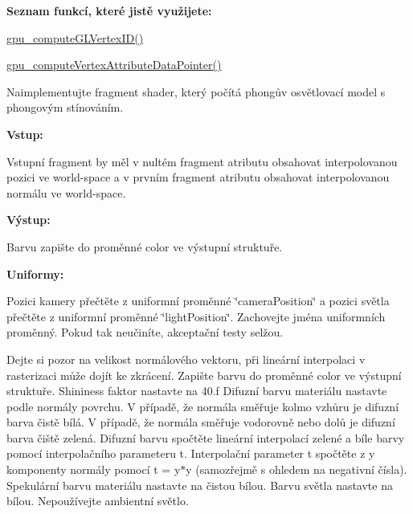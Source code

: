 \begin{DoxyRefList}
 {\bfseries Seznam funkcí, které jistě využijete\-:}
\begin{DoxyItemize}
\item \hyperlink{group__gpu__side_ga3983ddd2c559c1a6d1e1f1f37be3eae0}{gpu\-\_\-compute\-G\-L\-Vertex\-I\-D()}
\item \hyperlink{group__gpu__side_ga4b894f26ed3c06346da10fc6c41f90eb}{gpu\-\_\-compute\-Vertex\-Attribute\-Data\-Pointer()}  
\end{DoxyItemize}
\item[\label{todo__todo000009}%
\hypertarget{todo__todo000009}{}%
Global \hyperlink{group__shader__side_ga9cb61ad448e54a23ba4d01a6ebdb48eb}{phong\-\_\-fragment\-Shader} (\hyperlink{structGPUFragmentShaderOutput}{G\-P\-U\-Fragment\-Shader\-Output} $\ast$const output, \hyperlink{structGPUFragmentShaderInput}{G\-P\-U\-Fragment\-Shader\-Input} const $\ast$const input, G\-P\-U const gpu)]Naimplementujte fragment shader, který počítá phongův osvětlovací model s phongovým stínováním.\par
 {\bfseries Vstup\-:}\par
 Vstupní fragment by měl v nultém fragment atributu obsahovat interpolovanou pozici ve world-\/space a v prvním fragment atributu obsahovat interpolovanou normálu ve world-\/space.\par
 {\bfseries Výstup\-:}\par
 Barvu zapište do proměnné color ve výstupní struktuře.\par
 {\bfseries Uniformy\-:}\par
 Pozici kamery přečtěte z uniformní proměnné \char`\"{}camera\-Position\char`\"{} a pozici světla přečtěte z uniformní proměnné \char`\"{}light\-Position\char`\"{}. Zachovejte jména uniformních proměnný. Pokud tak neučiníte, akceptační testy selžou.\par
 \par
 Dejte si pozor na velikost normálového vektoru, při lineární interpolaci v rasterizaci může dojít ke zkrácení. Zapište barvu do proměnné color ve výstupní struktuře. Shininess faktor nastavte na 40.\-f Difuzní barvu materiálu nastavte podle normály povrchu. V případě, že normála směřuje kolmo vzhůru je difuzní barva čistě bílá. V případě, že normála směřuje vodorovně nebo dolů je difuzní barva čiště zelená. Difuzní barvu spočtěte lineární interpolací zelené a bíle barvy pomocí interpolačního parameteru t. Interpolační parameter t spočtěte z y komponenty normály pomocí t = y$\ast$y (samozřejmě s ohledem na negativní čísla). Spekulární barvu materiálu nastavte na čistou bílou. Barvu světla nastavte na bílou. Nepoužívejte ambientní světlo.\par

\end{DoxyRefList}
